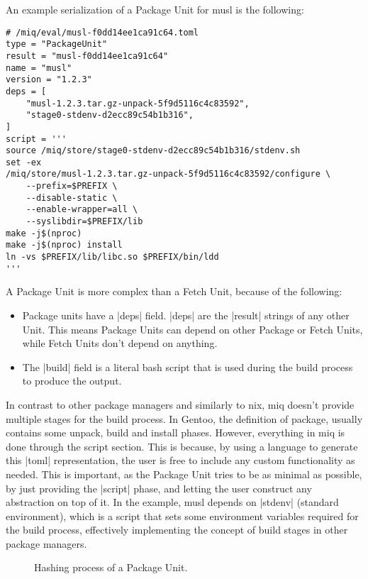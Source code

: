 An example serialization of a Package Unit for musl is the
following:

\begin{verbatim}
# /miq/eval/musl-f0dd14ee1ca91c64.toml
type = "PackageUnit"
result = "musl-f0dd14ee1ca91c64"
name = "musl"
version = "1.2.3"
deps = [
    "musl-1.2.3.tar.gz-unpack-5f9d5116c4c83592",
    "stage0-stdenv-d2ecc89c54b1b316",
]
script = '''
source /miq/store/stage0-stdenv-d2ecc89c54b1b316/stdenv.sh
set -ex
/miq/store/musl-1.2.3.tar.gz-unpack-5f9d5116c4c83592/configure \
    --prefix=$PREFIX \
    --disable-static \
    --enable-wrapper=all \
    --syslibdir=$PREFIX/lib
make -j$(nproc)
make -j$(nproc) install
ln -vs $PREFIX/lib/libc.so $PREFIX/bin/ldd
'''
\end{verbatim}

A Package Unit is more complex than a Fetch Unit, because of
the following:
\begin{itemize}
    \item Package units have a |deps| field. |deps| are the
    |result| strings of any other Unit. This means Package
    Units can depend on other Package or Fetch Units, while
    Fetch Units don't depend on anything.
    \item The |build| field is a literal bash script that is
    used during the build process to produce the output.
\end{itemize}

In contrast to other package managers and similarly to nix,
miq doesn't provide multiple stages for the build process.
In Gentoo, the definition of package, usually contains some
unpack, build and install phases. However, everything in
miq is done through the script section. This is because, by
using a language to generate this |toml| representation, the
user is free to include any custom functionality as needed.
This is important, as the Package Unit tries to be as
minimal as possible, by just providing the |script| phase,
and letting the user construct any abstraction on top of it.
In the example, musl depends on |stdenv| (standard environment), which is a script
that sets some environment variables required for the build
process, effectively implementing the concept of build
stages in other package managers.

\begin{figure}[hbt]
    \centerfloat
    
    \caption{Hashing process of a Package Unit.}
    \label{fig:pkg_hash}
\end{figure}

